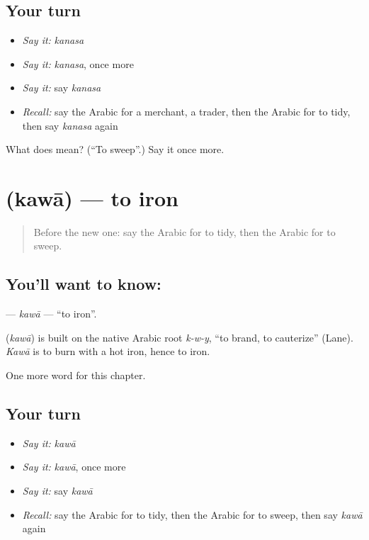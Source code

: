 \subsection*{Your turn}
\begin{itemize}
\raggedright
  \item \emph{Say it:} \emph{kanasa}
  \item \emph{Say it:} \emph{kanasa}, once more
  \item \emph{Say it:} say \emph{kanasa}
  \item \emph{Recall:} say the Arabic for a merchant, a trader, then the Arabic for to tidy, then say \emph{kanasa} again
\end{itemize}

\begin{tcolorbox}[breakable,colback=teal!4,colframe=teal!35!black,title={Before you move on}]
What does  mean? (\textquotedblleft{}To sweep\textquotedblright{}.) Say it once more.
\end{tcolorbox}
\section[\texorpdfstring{\ar{كوى} (kawā)}{كوى (kawā)}]{ (kawā) — to iron}

\label{lesson:AR-C223-kawa}



\begin{quote}
Before the new one: say the Arabic for to tidy, then the Arabic for to sweep.
\end{quote}

\subsection*{You'll want to know: }
\textbf{} — \emph{kawā} — \textquotedblleft{}to iron\textquotedblright{}.

\begin{cousinweb}
\textbf{} (\emph{kawā}) is built on the native Arabic root \emph{k-w-y}, \textquotedblleft{}to brand, to cauterize\textquotedblright{} (Lane). \emph{Kawā} is to burn with a hot iron, hence to iron.
\end{cousinweb}

\begin{grammarlens}[title={What you've built}]
One more word for this chapter.
\end{grammarlens}

\subsection*{Your turn}
\begin{itemize}
\raggedright
  \item \emph{Say it:} \emph{kawā}
  \item \emph{Say it:} \emph{kawā}, once more
  \item \emph{Say it:} say \emph{kawā}
  \item \emph{Recall:} say the Arabic for to tidy, then the Arabic for to sweep, then say \emph{kawā} again
\end{itemize}


